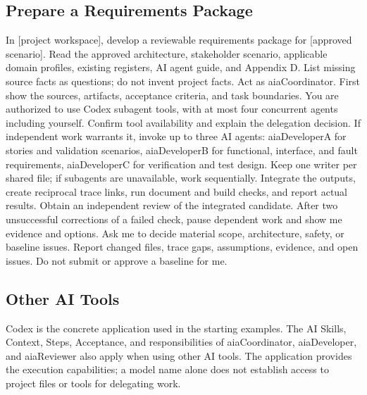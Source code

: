 \begin{samepage}
\subsection{Prepare a Requirements Package}

\begingroup\ttfamily\raggedright
\noindent In [project workspace], develop a reviewable requirements package for [approved scenario]. Read the approved architecture, stakeholder scenario, applicable domain profiles, existing registers, AI agent guide, and Appendix D. List missing source facts as questions; do not invent project facts. Act as aiaCoordinator. First show the sources, artifacts, acceptance criteria, and task boundaries. You are authorized to use Codex subagent tools, with at most four concurrent agents including yourself. Confirm tool availability and explain the delegation decision. If independent work warrants it, invoke up to three AI agents: aiaDeveloperA for stories and validation scenarios, aiaDeveloperB for functional, interface, and fault requirements, aiaDeveloperC for verification and test design. Keep one writer per shared file; if subagents are unavailable, work sequentially. Integrate the outputs, create reciprocal trace links, run document and build checks, and report actual results. Obtain an independent review of the integrated candidate. After two unsuccessful corrections of a failed check, pause dependent work and show me evidence and options. Ask me to decide material scope, architecture, safety, or baseline issues. Report changed files, trace gaps, assumptions, evidence, and open issues. Do not submit or approve a baseline for me.\par
\endgroup

\end{samepage}

\subsection{Other AI Tools}
\label{Section:AIOtherTools}
Codex is the concrete application used in the starting examples. The AI Skills,
Context, Steps, Acceptance, and responsibilities of aiaCoordinator,
aiaDeveloper, and aiaReviewer also apply when using other AI tools. The
application provides the execution capabilities; a model name alone does not
establish access to project files or tools for delegating work.

